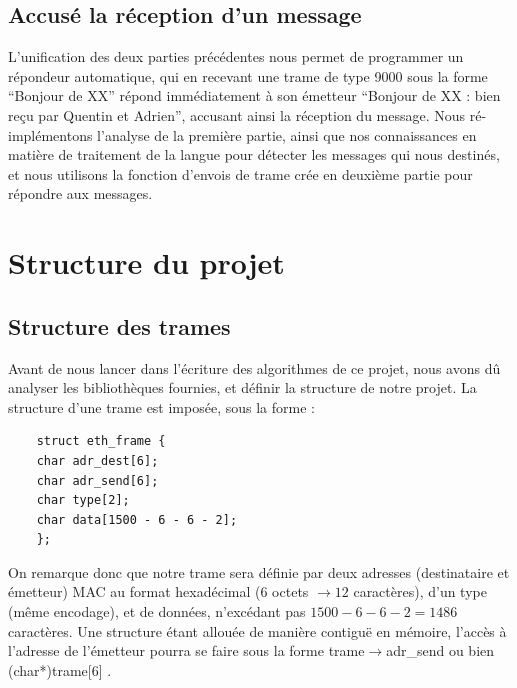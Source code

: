 \documentclass[a4paper,11pt]{article}
\begin{document}
	\subsection{Accusé la réception d'un message}
	L'unification des deux parties précédentes nous permet de programmer un répondeur automatique, qui en recevant une trame de type 9000 sous la forme ``Bonjour de XX'' répond immédiatement à son émetteur ``Bonjour de XX : bien reçu par Quentin et Adrien'', accusant ainsi la réception du message. Nous ré-implémentons l'analyse de la première partie, ainsi que nos connaissances en matière de traitement de la langue pour détecter les messages qui nous destinés, et nous utilisons la fonction d'envois de trame crée en deuxième partie pour répondre aux messages.
	\section{Structure du projet}
	\subsection{Structure des trames}
	Avant de nous lancer dans l'écriture des algorithmes de ce projet, nous avons dû analyser les bibliothèques fournies, et définir la structure de notre projet. La structure d'une trame est imposée, sous la forme :
	\lstset{language=C}
	\begin{lstlisting}
	struct eth_frame {
	char adr_dest[6];
	char adr_send[6];
	char type[2];
	char data[1500 - 6 - 6 - 2];
	};
	\end{lstlisting}
	On remarque donc que notre trame sera définie par deux adresses (destinataire et émetteur) MAC au format hexadécimal ($ 6$ octets $\to 12$ caractères), d'un type (même encodage), et de données, n'excédant pas $1500-6-6-2=1486$ caractères. Une structure étant allouée de manière contiguë en mémoire, l'accès à l'adresse de l'émetteur pourra se faire sous la forme trame$\to$adr\_send ou bien (char*)trame[6] .
\end{document}
